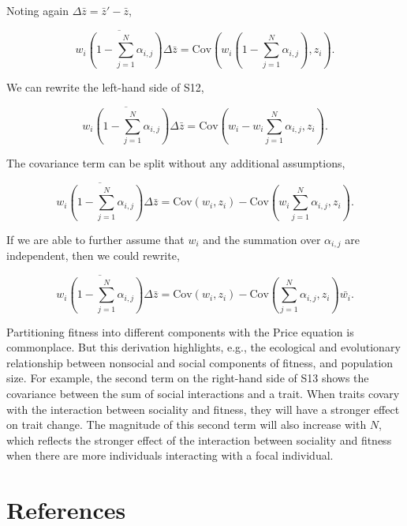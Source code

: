 \documentclass[
]{article}
\begin{document}
Noting again \(\Delta \bar{z} = \bar{z}' - \bar{z}\),

\[\overline{w_{i}\left(1 - \sum_{j=1}^{N}\alpha_{i, j}\right)}\Delta\bar{z} = \mathrm{Cov}\left(w_{i}\left(1 - \sum_{j=1}^{N}\alpha_{i, j}\right), z_{i}  \right). 
\tag{S12}
\]

We can rewrite the left-hand side of S12,

\[\overline{w_{i}\left(1 - \sum_{j=1}^{N}\alpha_{i, j}\right)}\Delta\bar{z} = \mathrm{Cov}\left(w_{i} - w_{i}\sum_{j=1}^{N}\alpha_{i, j}, z_{i}  \right). 
\tag{S13}
\]

The covariance term can be split without any additional assumptions,

\[\overline{w_{i}\left(1 - \sum_{j=1}^{N}\alpha_{i, j}\right)}\Delta\bar{z} = \mathrm{Cov}\left(w_{i}, z_{i}  \right) - \mathrm{Cov}\left(w_{i}\sum_{j=1}^{N}\alpha_{i, j}, z_{i}  \right). 
\tag{S14}
\]

If we are able to further assume that \(w_{i}\) and the summation over
\(\alpha_{i,j}\) are independent, then we could rewrite,

\[\overline{w_{i}\left(1 - \sum_{j=1}^{N}\alpha_{i, j}\right)}\Delta\bar{z} = \mathrm{Cov}\left(w_{i}, z_{i}  \right) - \mathrm{Cov}\left(\sum_{j=1}^{N}\alpha_{i, j}, z_{i}  \right)\bar{w_{i}}. 
\tag{S15}
\]

Partitioning fitness into different components with the Price equation
is commonplace. But this derivation highlights, e.g., the ecological and
evolutionary relationship between nonsocial and social components of
fitness, and population size. For example, the second term on the
right-hand side of S13 shows the covariance between the sum of social
interactions and a trait. When traits covary with the interaction
between sociality and fitness, they will have a stronger effect on trait
change. The magnitude of this second term will also increase with \(N\),
which reflects the stronger effect of the interaction between sociality
and fitness when there are more individuals interacting with a focal
individual.

\section*{References}\label{references}
\end{document}
